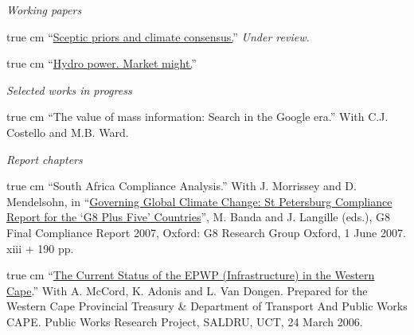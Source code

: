 \documentclass[10pt]{article}
\def\ind{\hangindent=1 true cm \hangafter=1 \vspace{.5em} \noindent}
\renewcommand{\section}[1]{\pagebreak[3]%
    \vspace{1.3\baselineskip}%
    \phantomsection\addcontentsline{toc}{section}{#1}%
    \noindent\llap{\textsf{\parbox[t]{\marginparwidth}{\hyphenpenalty=10000\raggedright #1}}}%
    \vspace{-\baselineskip}\par}
\newcommand{\blankline}{\quad\pagebreak[3]}
\begin{document}
\blankline

\emph{Working papers}

\ind ``\href{https://drive.google.com/file/d/0B6AgOxtQA9dTcjRmZkNjMVhuVFU/view?usp=sharing}{Sceptic priors and climate consensus.}'' \textit{Under review.}

\ind ``\href{https://drive.google.com/file/d/0B6AgOxtQA9dTaWcxdHpsNE5wdjA/view?usp=sharing}{Hydro power. Market might.}''

\blankline

\emph{Selected works in progress}

\ind ``The value of mass information: Search in the Google era.'' With C.J. Costello and M.B. Ward.

\blankline

\emph{Report chapters}
	
	\ind ``South Africa Compliance Analysis.'' With J. Morrissey and D. Mendelsohn, in ``\href{http://www.g8.utoronto.ca/oxford/2006compliance-ox.pdf}{Governing Global Climate Change: St Petersburg Compliance Report for the `G8 Plus Five' Countries}'', M. Banda and J. Langille (eds.), G8 Final Compliance Report 2007, Oxford: G8 Research Group Oxford, 1 June 2007. xiii + 190 pp.
	
	\ind ``\href{http://www.saldru.uct.ac.za/home/index.php?/component/option,com_docman/Itemid,37/gid,294/task,doc_view/}{The Current Status of the EPWP (Infrastructure) in the Western Cape}.'' With A. McCord, K. Adonis and L. Van Dongen. Prepared for the Western Cape Provincial Treasury \& Department of Transport And Public Works CAPE. Public Works Research Project, SALDRU, UCT, 24 March 2006.



\end{document}
